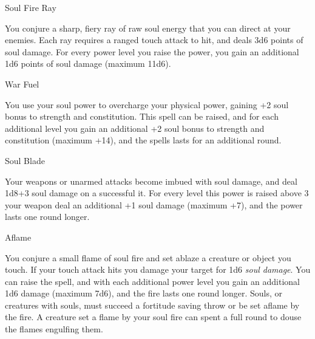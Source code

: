 \begin{soulpower}{Soul Fire Ray}
  \rangeclose
  \instantaneous

  You conjure a sharp, fiery ray of raw soul energy that you can direct at
  your enemies. Each ray requires a ranged touch attack to hit, and deals 3d6
  points of soul damage. For every power level you raise the power, you gain
  an additional 1d6 points of soul damage (maximum 11d6).
\end{soulpower}

\begin{soulpower}{War Fuel}
  \rangepersonal

  You use your soul power to overcharge your physical power, gaining +2 soul
  bonus to strength and constitution. This spell can be raised, and for each
  additional level you gain an additional +2 soul bonus to strength and
  constitution (maximum +14), and the spells lasts for an additional round.
\end{soulpower}

\begin{soulpower}{Soul Blade}

  Your weapons or unarmed attacks become imbued with soul damage, and deal
  1d8+3 soul damage on a successful it. For every level this power is raised
  above 3 your weapon deal an additional +1 soul damage (maximum +7), and the
  power lasts one round longer.
\end{soulpower}

\begin{soulpower}{Aflame}

  You conjure a small flame of soul fire and set ablaze a creature or object
  you touch. If your touch attack hits you damage your target for 1d6
  \emph{soul damage}. You can raise the spell, and with each additional power
  level you gain an additional 1d6 damage (maximum 7d6), and the fire lasts
  one round longer.  Souls, or creatures with souls, must succeed a fortitude
  saving throw or be set aflame by the fire. A creature set a flame by your
  soul fire can spent a full round to douse the flames engulfing them.
\end{soulpower}

